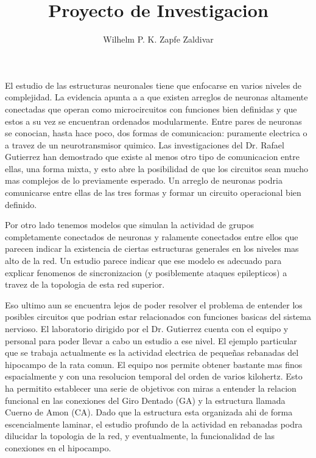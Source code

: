 \documentclass[letterpaper, 10pt]{article}
\title{Proyecto de Investigacion}
\author{Wilhelm P. K. Zapfe Zaldivar}
\begin{document}
\maketitle

El estudio de las estructuras neuronales tiene que enfocarse en varios niveles
de complejidad. La evidencia apunta a a que existen arreglos de neuronas
altamente conectadas que operan como microcircuitos con funciones bien
definidas y que estos a su vez se encuentran ordenados modularmente. 
Entre pares de neuronas se conocian, hasta hace poco, dos formas de
comunicacion: puramente electrica o a travez de un neurotransmisor quimico. 
Las investigaciones del Dr. Rafael Gutierrez han 
demostrado que existe al menos otro tipo de comunicacion entre ellas,
una forma mixta, y esto
abre la posibilidad de que los circuitos sean mucho mas complejos de lo 
previamente esperado. Un arreglo de neuronas podria comunicarse entre ellas 
de las tres formas y formar un circuito operacional bien definido.

Por otro lado tenemos modelos que simulan la actividad de grupos completamente
conectados de neuronas y ralamente conectados entre ellos que parecen
indicar la existencia de ciertas estructuras generales en los  niveles mas alto
de la red. Un estudio parece indicar que ese modelo es adecuado para
explicar fenomenos de sincronizacion (y posiblemente ataques epilepticos)
a travez de la topologia de esta red superior. 

Eso ultimo aun se encuentra lejos de poder resolver el problema
de entender los posibles circuitos que podrian estar relacionados
con funciones basicas del sistema nervioso. 
El laboratorio dirigido por el Dr. Gutierrez cuenta con el equipo y personal para 
poder llevar a cabo un estudio a ese nivel. El ejemplo particular
que se trabaja actualmente es la actividad electrica de pequeñas rebanadas
del hipocampo de la rata comun. El equipo nos permite obtener bastante mas finos
espacialmente y con una resolucion temporal del orden de varios kilohertz. 
Esto ha permitito establecer una serie de objetivos con miras a entender la relacion
funcional en las conexiones del Giro Dentado (GA) y la estructura llamada
Cuerno de Amon (CA). Dado que la estructura esta organizada ahi de forma 
escencialmente laminar, el estudio profundo de la actividad en rebanadas
podra dilucidar la topologia de la red, y eventualmente, 
la funcionalidad de las conexiones en el hipocampo. 
\end{document}
